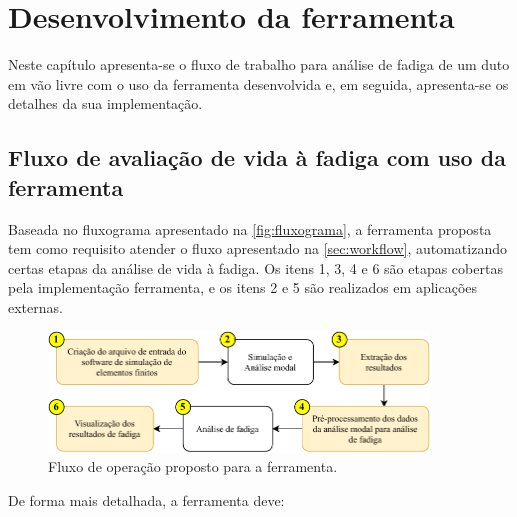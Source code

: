 \chapter{Desenvolvimento da ferramenta}\label{chap:software}

Neste capítulo apresenta-se o fluxo de trabalho para análise de fadiga de um duto em vão livre com o uso da ferramenta desenvolvida e, em seguida, apresenta-se os detalhes da sua implementação.


\section{Fluxo de avaliação de vida à fadiga com uso da ferramenta}\label{sec:fluxo-com-ferramenta}

Baseada no fluxograma apresentado na \autoref{fig:fluxograma}, a ferramenta proposta tem como requisito atender o fluxo apresentado na \autoref{sec:workflow}, automatizando certas etapas da análise de vida à fadiga. Os itens 1, 3, 4 e 6 são etapas cobertas pela implementação ferramenta, e os itens 2 e 5 são realizados em aplicações externas.


\begin{figure}[!ht]
    \centering
    \caption{Fluxo de operação proposto para a ferramenta.}\label{fig:workflow}
    \includegraphics[width=0.9\textwidth]{imagens/fluxograma_automatizado}
\end{figure}

De forma mais detalhada, a ferramenta deve:


